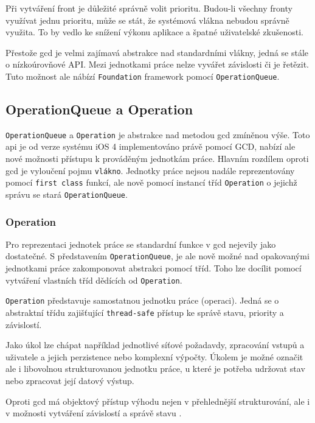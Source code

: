 Při vytváření front je důležité správně volit prioritu.
Budou-li všechny fronty využívat jednu prioritu, může se stát, že systémová vlákna nebudou správně využita.
To by vedlo ke snížení výkonu aplikace a špatné uživatelské zkušenosti.

Přestože \acrshort{gcd} je velmi zajímavá abstrakce nad standardními vlákny, jedná se stále o nízkoúrovňové API.
Mezi jednotkami práce nelze vyvářet závislosti či je řetězit.
Tuto možnost ale nábízí \texttt{Foundation} framework pomocí \texttt{OperationQueue}.

\subsection{OperationQueue a Operation}

\texttt{OperationQueue} a \texttt{Operation} je abstrakce nad metodou \acrshort{gcd} zmíněnou výše.
Toto \acrshort{api} je od verze systému iOS 4 implementováno právě pomocí GCD, nabízí ale nové možnosti přístupu k prováděným jednotkám práce.
Hlavním rozdílem oproti \acrshort{gcd} je vyloučení pojmu \texttt{vlákno}.
Jednotky práce nejsou nadále reprezentovány pomocí \texttt{first class} funkcí, ale nově pomocí instancí tříd \texttt{Operation} o jejichž správu se stará \texttt{OperationQueue}. \cite{cocoacasts-nsoperation-vs-gcd}

\subsubsection*{Operation}

Pro reprezentaci jednotek práce se standardní funkce v \acrshort{gcd} nejevily jako dostatečné.
S představením \texttt{OperationQueue}, je ale nově možné nad opakovanými jednotkami práce zakomponovat abstrakci pomocí tříd.
Toho lze docílit pomocí vytváření vlastních tříd dědících od \texttt{Operation}.

\texttt{Operation} představuje samostatnou jednotku práce (operaci).
Jedná se o abstraktní třídu zajišťující \texttt{thread-safe} přístup ke správě stavu, priority a závislostí.

Jako úkol lze chápat například jednotlivé síťové požadavdy, zpracování vstupů a uživatele a jejich perzistence nebo komplexní výpočty.
Úkolem je možné označit ale i libovolnou strukturovanou jednotku práce, u které je potřeba udržovat stav nebo zpracovat její datový výstup.

Oproti \acrshort{gcd} má objektový přístup výhodu nejen v přehlednější strukturování, ale i v možnosti vytváření závislostí a správě stavu \cite{apple-operation-queues}.

